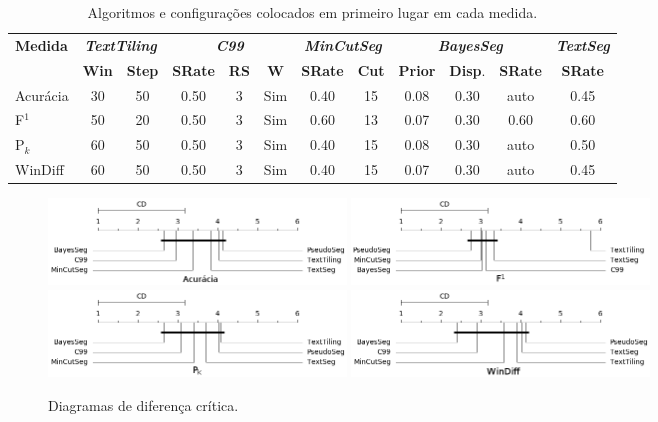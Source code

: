\begin{table}[!htp]
\centering
\tiny
\begin{tabular}{|l|c|c|c|c|c|c|c|c|c|c|c|}\hline
\multirow{2}{*}{\textbf{Medida}}    & 
\multicolumn{2}{c|}{\textit{\textbf{TextTiling}}} & 
\multicolumn{3}{c|}{\textit{\textbf{C99}}}& 
\multicolumn{2}{c|}{\textit{\textbf{MinCutSeg}}} & 
\multicolumn{3}{c|}{\textit{\textbf{BayesSeg}}} & 
\multicolumn{1}{c|}{\textit{\textbf{TextSeg}}}  \\
& \textbf{Win}&\textbf{Step} & \textbf{SRate}&\textbf{RS}&\textbf{W} & \textbf{SRate}&\textbf{Cut} & \textbf{Prior}&\textbf{Disp}.&\textbf{SRate} & \textbf{SRate}\\
\hline \hline 
Acurácia  &  30 & 50 &  0.50 & 3 & Sim &  0.40 & 15   &  0.08 & 0.30 & auto &  0.45 \\
F$^1$     &  50 & 20 &  0.50 & 3 & Sim &  0.60 & 13   &  0.07 & 0.30 & 0.60 &  0.60 \\
P$_k$     &  60 & 50 &  0.50 & 3 & Sim &  0.40 & 15   &  0.08 & 0.30 & auto &  0.50 \\
WinDiff   &  60 & 50 &  0.50 & 3 & Sim &  0.40 & 15   &  0.07 & 0.30 & auto &  0.45 \\
\hline
\end{tabular}
\caption{Algoritmos e configurações colocados em primeiro lugar em cada medida.}
\label{tab:configuracoes-ranking-um}
\end{table}






\begin{figure}[!h]
	\centering     %
		\includegraphics[width=79mm]{conteudo/capitulos/figs/cds2/Acuracia.png} 
		\includegraphics[width=79mm]{conteudo/capitulos/figs/cds2/F1.png} 
		\includegraphics[width=79mm]{conteudo/capitulos/figs/cds2/Pk.png}
		\includegraphics[width=79mm]{conteudo/capitulos/figs/cds2/WD.png}
		\caption{Diagramas de diferença crítica.}
		\label{fig:cds}
\end{figure}


